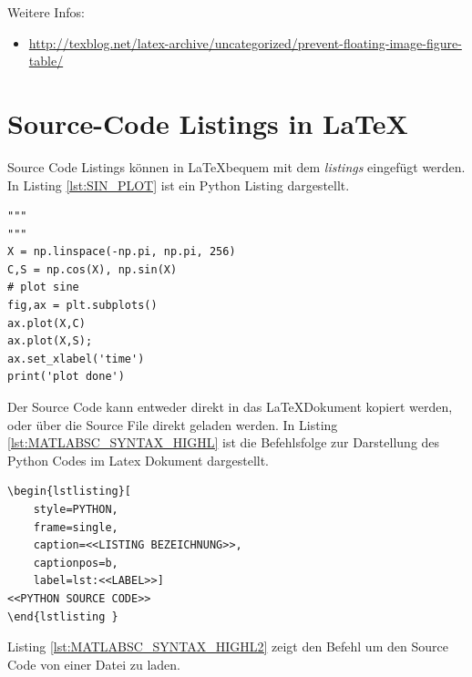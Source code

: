 \documentclass[TGAI_Laborbericht.tex]{subfiles}
\begin{document}
Weitere Infos:
\begin{itemize}
  \item \href{http://texblog.net/latex-archive/uncategorized/prevent-floating-image-figure-table/}{http://texblog.net/latex-archive/uncategorized/prevent-floating-image-figure-table/}
\end{itemize}

\section{Source-Code Listings in \LaTeX}
Source Code Listings können in \LaTeX bequem mit dem \textit{listings} eingefügt werden. In Listing \ref{lst:SIN_PLOT} ist ein Python Listing dargestellt.
\begin{lstlisting}[style=PYTHON, frame=single, caption=Sinus Plot, captionpos=b, label=lst:SIN_PLOT]
"""
"""
X = np.linspace(-np.pi, np.pi, 256)
C,S = np.cos(X), np.sin(X)
# plot sine
fig,ax = plt.subplots()
ax.plot(X,C)
ax.plot(X,S);
ax.set_xlabel('time')
print('plot done')
\end{lstlisting}
Der Source Code kann entweder direkt in das \LaTeX Dokument kopiert werden, oder über die Source File direkt geladen werden. In Listing \ref{lst:MATLABSC_SYNTAX_HIGHL} ist die Befehlsfolge zur Darstellung des Python Codes im Latex Dokument dargestellt. 
\begin{lstlisting}[style=LATEX, frame=single, caption=Latex Source Code Syntax Highlighting Prototyp, captionpos=b, label=lst:MATLABSC_SYNTAX_HIGHL]
\begin{lstlisting}[
	style=PYTHON,
	frame=single, 
	caption=<<LISTING BEZEICHNUNG>>, 
	captionpos=b, 
	label=lst:<<LABEL>>]
<<PYTHON SOURCE CODE>>
\end{lstlisting }
\end{lstlisting}
Listing \ref{lst:MATLABSC_SYNTAX_HIGHL2} zeigt den Befehl um den Source Code von einer Datei zu laden.
\begin{lstlisting}[style=LATEX, frame=single, caption=Source Code in Latex Dokument, captionpos=b, label=lst:MATLABSC_SYNTAX_HIGHL2]

\end{lstlisting}


%
%

\end{document}
